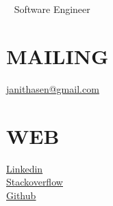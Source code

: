 \documentclass[]{cv-class}
\begin{document}
\begin{aside}
\color{blue}
  \section{}
  	\vspace{0.5cm}
   ~  
      {Software Engineer}
   ~
  \section{MAILING}
    \underline{\href{mailto:janithasen@gmail.com}{{\whitebodyfont janithasen@gmail.com}}}
    ~
  \section{WEB}
  	\vspace{0.10cm}
    \underline{\href{https://www.linkedin.com/in/janithamadushan}{{\whitebodyfont Linkedin}}}
    \\
	\vspace{0.10cm}
    \underline{\href{https://stackoverflow.com/users/4412223/janitha-madushan}{{\whitebodyfont Stackoverflow}}}
	\\	
	\vspace{0.10cm}
    \underline{\href{https://github.com/janitham}{{\whitebodyfont Github}}}
    ~

\end{aside}
\end{document}

